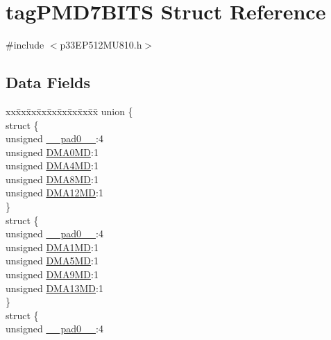 \hypertarget{structtag_p_m_d7_b_i_t_s}{}\section{tag\+P\+M\+D7\+B\+I\+TS Struct Reference}
\label{structtag_p_m_d7_b_i_t_s}


{\ttfamily \#include $<$p33\+E\+P512\+M\+U810.\+h$>$}

\subsection*{Data Fields}
\begin{DoxyCompactItemize}
\item 
\begin{tabbing}
xx\=xx\=xx\=xx\=xx\=xx\=xx\=xx\=xx\=\kill
union \{\\
\>struct \{\\
\>\>unsigned \hyperlink{structtag_p_m_d7_b_i_t_s_adf71f3d8410c1f1dbbc96680a92c49af}{\_\_pad0\_\_}:4\\
\>\>unsigned \hyperlink{structtag_p_m_d7_b_i_t_s_a7329df7814141fe009acd701cc380cc9}{DMA0MD}:1\\
\>\>unsigned \hyperlink{structtag_p_m_d7_b_i_t_s_af0ce591e5ed4db6abf6bb2c9442b8e18}{DMA4MD}:1\\
\>\>unsigned \hyperlink{structtag_p_m_d7_b_i_t_s_a01715215f2b5f7cdb0d1f5d17b511b36}{DMA8MD}:1\\
\>\>unsigned \hyperlink{structtag_p_m_d7_b_i_t_s_a019db6d766a9dcc9a7c0bc41b777fbf7}{DMA12MD}:1\\
\>\} \\
\>struct \{\\
\>\>unsigned \hyperlink{structtag_p_m_d7_b_i_t_s_adf71f3d8410c1f1dbbc96680a92c49af}{\_\_pad0\_\_}:4\\
\>\>unsigned \hyperlink{structtag_p_m_d7_b_i_t_s_a4b7305ea58ba31174bc1321bd582e072}{DMA1MD}:1\\
\>\>unsigned \hyperlink{structtag_p_m_d7_b_i_t_s_af00f50f7b5bcc023ac1e8829cc0cc15a}{DMA5MD}:1\\
\>\>unsigned \hyperlink{structtag_p_m_d7_b_i_t_s_a76cf5463275a214ba2a90277f191213f}{DMA9MD}:1\\
\>\>unsigned \hyperlink{structtag_p_m_d7_b_i_t_s_a01441c1d54b301ee404d3ff10c6a3824}{DMA13MD}:1\\
\>\} \\
\>struct \{\\
\>\>unsigned \hyperlink{structtag_p_m_d7_b_i_t_s_adf71f3d8410c1f1dbbc96680a92c49af}{\_\_pad0\_\_}:4\\

\end{tabbing}
\end{DoxyCompactItemize}
